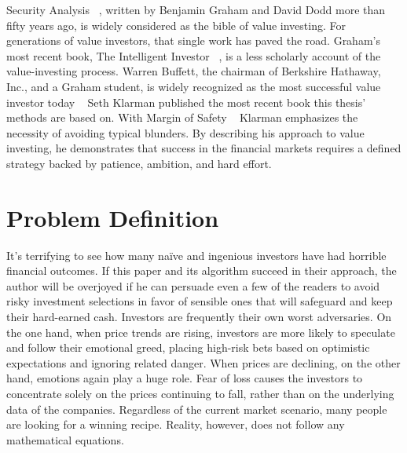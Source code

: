 \documentclass{imc-inf}
\begin{document}
Security Analysis ~\cite{security_analysis}, written by Benjamin Graham and David Dodd more than fifty years ago, is widely considered as the bible of value investing. For generations of value investors, that single work has paved the road. Graham's most recent book, The Intelligent Investor ~\cite{the_intelligent_investor}, is a less scholarly account of the value-investing process. Warren Buffett, the chairman of Berkshire Hathaway, Inc., and a Graham student, is widely recognized as the most successful value investor today ~\cite{margin_of_safety} Seth Klarman published the most recent book this thesis’ methods are based on. With Margin of Safety ~\cite{margin_of_safety} Klarman emphasizes the necessity of avoiding typical blunders. By describing his approach to value investing, he demonstrates that success in the financial markets requires a defined strategy backed by patience, ambition, and hard effort.

\section{Problem Definition}%
It's terrifying to see how many naïve and ingenious investors have had horrible financial outcomes. If this paper and its algorithm succeed in their approach, the author will be overjoyed if he can persuade even a few of the readers to avoid risky investment selections in favor of sensible ones that will safeguard and keep their hard-earned cash.
Investors are frequently their own worst adversaries. On the one hand, when price trends are rising, investors are more likely to speculate and follow their emotional greed, placing high-risk bets based on optimistic expectations and ignoring related danger. When prices are declining, on the other hand, emotions again play a huge role. Fear of loss causes the investors to concentrate solely on the prices continuing to fall, rather than on the underlying data of the companies. Regardless of the current market scenario, many people are looking for a winning recipe. Reality, however, does not follow any mathematical equations.
\end{document}
